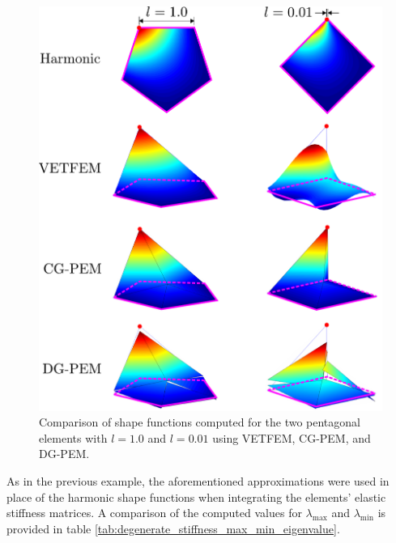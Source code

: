 \begin{figure}[!h]
  \centering
  \includegraphics[width=5.0in]{figures/degenerate_element_comparison.pdf}  \caption{Comparison of shape functions computed for the two pentagonal elements with $l=1.0$ and $l=0.01$ using VETFEM, CG-PEM, and DG-PEM.}
  \label{fig:degenerate_element_comparison}
\end{figure}

As in the previous example, the aforementioned approximations were used in place of the harmonic shape functions when integrating the elements' elastic stiffness matrices. A comparison of the computed values for $\lambda_{\max}$ and $\lambda_{\min}$ is provided in table \ref{tab:degenerate_stiffness_max_min_eigenvalue}.

